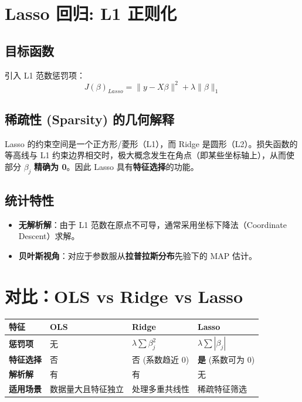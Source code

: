 \documentclass[12pt, a4paper]{article}
\begin{document}
\section{Lasso 回归: L1 正则化}

\subsection{目标函数}
引入 L1 范数惩罚项：
$$ J(\beta)_{Lasso} = \|y - X\beta\|^2 + \lambda \|\beta\|_1 $$

\subsection{稀疏性 (Sparsity) 的几何解释}
Lasso 的约束空间是一个正方形/菱形（L1），而 Ridge 是圆形（L2）。损失函数的等高线与 L1 约束边界相交时，极大概念发生在角点（即某些坐标轴上），从而使部分 $\beta_j$ \textbf{精确为 0}。因此 Lasso 具有\textbf{特征选择}的功能。

\subsection{统计特性}
\begin{itemize}
    \item \textbf{无解析解}：由于 L1 范数在原点不可导，通常采用坐标下降法（Coordinate Descent）求解。
    \item \textbf{贝叶斯视角}：对应于参数服从\textbf{拉普拉斯分布}先验下的 MAP 估计。
\end{itemize}

\section{对比：OLS vs Ridge vs Lasso}
\begin{table}[h]
\centering
\begin{tabularx}{\textwidth}{|l|X|X|X|}
\hline
\textbf{特征} & \textbf{OLS} & \textbf{Ridge} & \textbf{Lasso} \\
\hline
\textbf{惩罚项} & 无 & $\lambda \sum \beta_j^2$ & $\lambda \sum |\beta_j|$ \\
\hline
\textbf{特征选择} & 否 & 否 (系数趋近 0) & \textbf{是} (系数可为 0) \\
\hline
\textbf{解析解} & 有 & 有 & 无 \\
\hline
\textbf{适用场景} & 数据量大且特征独立 & 处理多重共线性 & 稀疏特征筛选 \\
\hline
\end{tabularx}
\end{table}
\end{document}
